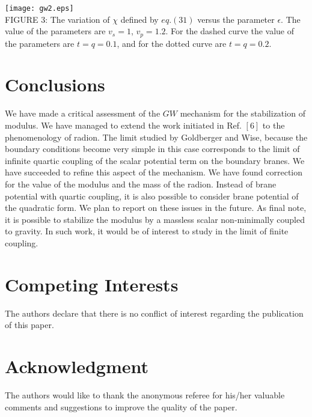 \documentclass[12pt]{article}
\begin{document}
\begin{center}
  \texttt{[image: gw2.eps]}\\
  {\small {FIGURE 3: The variation of $\chi$ defined by $eq.(31)$ versus the parameter
$\epsilon$. The value of the parameters are $v_s=1$,
$v_p=1.2$. For the dashed curve the value of the parameters
are $t=q=0.1$, and for the dotted curve are $t=q=0.2$. }}\\
\end{center}

\clearpage


\section{Conclusions}


We have made a critical assessment of the $GW$ mechanism for the
stabilization of modulus. We have managed to extend the work initiated in Ref. $[6]$ to the phenomenology of radion. The limit
studied by Goldberger and Wise, because the boundary conditions
become very simple in this case corresponds to
 the limit of infinite quartic coupling of the scalar potential term on the
boundary branes. We have succeeded to refine this aspect of the mechanism.
We have found correction for the value of the modulus and the mass of the
radion. Instead of brane potential with quartic coupling, it is also
possible to consider brane potential of the quadratic form. We plan
to report on these issues in the future. As final note, it is possible to stabilize the modulus by a massless scalar non-minimally coupled to gravity. In such work, it would be of interest to study in the limit of finite coupling.

\section{Competing Interests}
The authors declare that there is no conflict of interest regarding the publication of this paper.


\section{Acknowledgment}
The authors would like to thank the anonymous referee for his/her valuable comments and suggestions to improve the quality of the paper.
\end{document}
